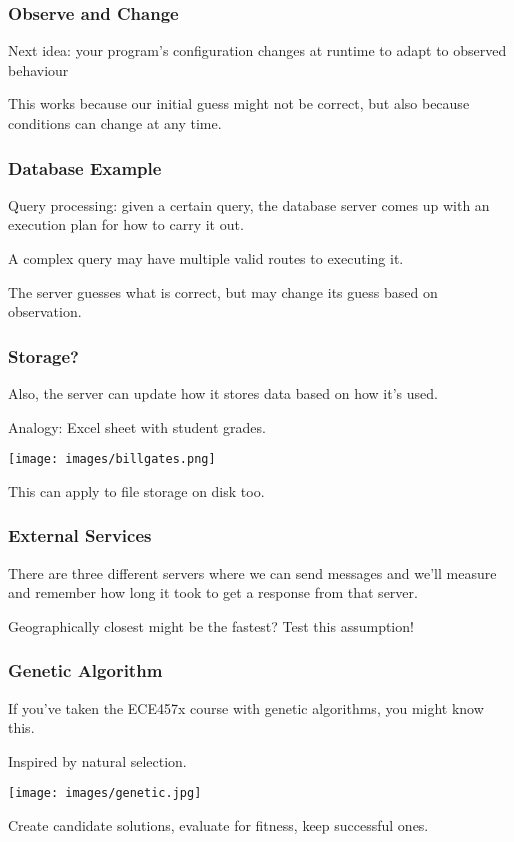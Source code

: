 \begin{frame}
\frametitle{Observe and Change}
Next idea:  your program's configuration changes at runtime to adapt to observed behaviour

This works because our initial guess might not be correct, but also because conditions can change at any time.

\end{frame}


\begin{frame}
\frametitle{Database Example}
Query processing: given a certain query, the database server comes up with an execution plan for how to carry it out.

A complex query may have multiple valid routes to executing it.

The server guesses what is correct, but may change its guess based on observation.

\end{frame}

\begin{frame}
\frametitle{Storage?}

Also, the server can update how it stores data based on how it's used.

Analogy: Excel sheet with student grades.

\begin{center}
	\texttt{[image: images/billgates.png]}
\end{center}

This can apply to file storage on disk too.

\end{frame}


\begin{frame}
\frametitle{External Services}

There are three different servers where we can send messages and we'll measure and remember how long it took to get a response from that server. 
 
Geographically closest might be the fastest? Test this assumption!

\end{frame}

\begin{frame}
\frametitle{Genetic Algorithm}
If you've taken the ECE457x course with genetic algorithms, you might know this.

Inspired by natural selection.

\begin{center}
	\texttt{[image: images/genetic.jpg]}
\end{center}

Create candidate solutions, evaluate for fitness, keep successful ones.

\end{frame}


